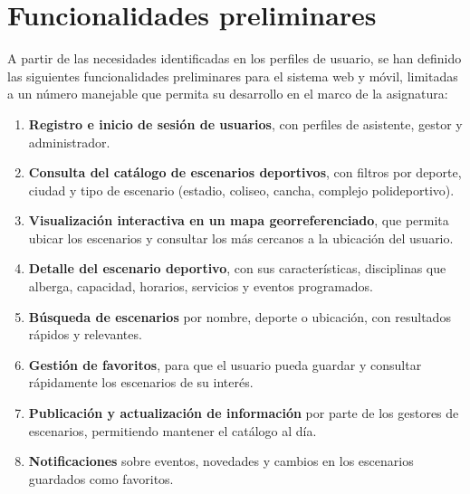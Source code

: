 
\section{Funcionalidades preliminares}

A partir de las necesidades identificadas en los perfiles de usuario, se han
definido las siguientes funcionalidades preliminares para el sistema web y
m\'ovil, limitadas a un n\'umero manejable que permita su desarrollo en el marco
de la asignatura:

\begin{enumerate}
  \item \textbf{Registro e inicio de sesi\'on de usuarios}, con perfiles de
    asistente, gestor y administrador.

  \item \textbf{Consulta del cat\'alogo de escenarios deportivos}, con filtros
    por deporte, ciudad y tipo de escenario (estadio, coliseo, cancha,
    complejo polideportivo).

  \item \textbf{Visualizaci\'on interactiva en un mapa georreferenciado}, que
    permita ubicar los escenarios y consultar los m\'as cercanos a la
    ubicaci\'on del usuario.

  \item \textbf{Detalle del escenario deportivo}, con sus caracter\'isticas,
    disciplinas que alberga, capacidad, horarios, servicios y eventos
    programados.

  \item \textbf{B\'usqueda de escenarios} por nombre, deporte o ubicaci\'on, con
    resultados r\'apidos y relevantes.

  \item \textbf{Gesti\'on de favoritos}, para que el usuario pueda guardar y
    consultar r\'apidamente los escenarios de su inter\'es.

  \item \textbf{Publicaci\'on y actualizaci\'on de informaci\'on} por parte de los
    gestores de escenarios, permitiendo mantener el cat\'alogo al d\'ia.

  \item \textbf{Notificaciones} sobre eventos, novedades y cambios en los
    escenarios guardados como favoritos.
\end{enumerate}
